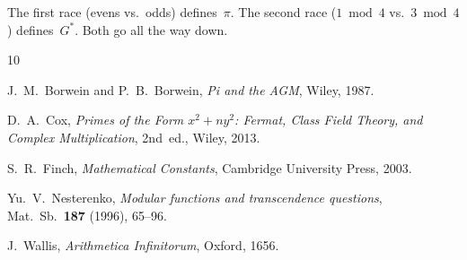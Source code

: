 \documentclass[12pt,reqno]{amsart}
\theoremstyle{definition}
\theoremstyle{remark}
\newcommand{\Gstar}{G^{\!*}}
\begin{document}
The first race (evens vs.\ odds) defines~$\pi$.  The second race
($1\bmod 4$ vs.\ $3\bmod 4$) defines~$\Gstar$.  Both go all the
way down.



\begin{thebibliography}{10}

J.~M.~Borwein and P.~B.~Borwein,
\emph{Pi and the AGM}, Wiley, 1987.

D.~A.~Cox,
\emph{Primes of the Form $x^{2}+ny^{2}$: Fermat, Class Field Theory,
and Complex Multiplication}, 2nd~ed., Wiley, 2013.

S.~R.~Finch,
\emph{Mathematical Constants}, Cambridge University Press, 2003.

Yu.~V.~Nesterenko,
\emph{Modular functions and transcendence questions},
Mat.\ Sb.\ \textbf{187} (1996), 65--96.

J.~Wallis,
\emph{Arithmetica Infinitorum}, Oxford, 1656.

\end{thebibliography}
\end{document}
